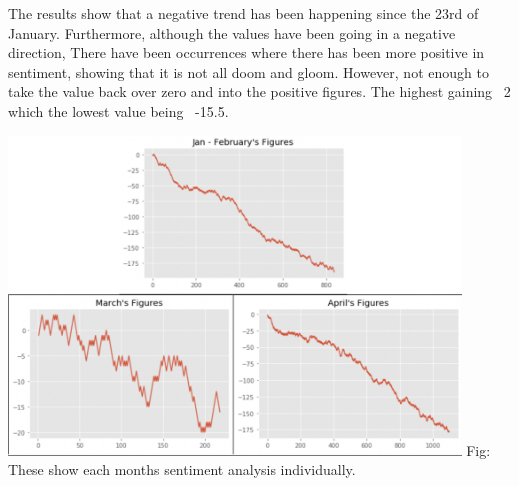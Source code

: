 \documentclass[a4paper,10pt]{article}
\begin{document}
The results show that a negative trend has been happening since the 23rd of January. Furthermore, although the values have been going in a negative direction, There have been occurrences where there has been more positive in sentiment, showing that it is not all doom and gloom. However, not enough to take the value back over zero and into the positive figures. The highest gaining ~2 which the lowest value being ~-15.5.
\begin{center}
	\label{confusion_matrix}
	\includegraphics[width=12cm]{eachmonth3.png}
	Fig:  These show each months sentiment analysis individually.
\end{center}

		
		
\end{document}
